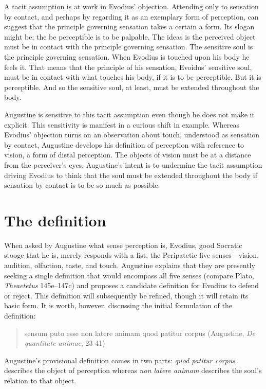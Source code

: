 \documentclass[12pt]{article}
\begin{document}
A tacit assumption is at work in Evodius' objection. Attending only to sensation by contact, and perhaps by regarding it as an exemplary form of perception, can suggest that the principle governing sensation takes a certain a form. Its slogan might be: the be perceptible is to be palpable. The ideas is the perceived object must be in contact with the principle governing sensation. The sensitive soul is the principle governing sensation. When Evodius is touched upon his body he feels it. That means that the principle of his sensation, Evoidus' sensitive soul, must be in contact with what touches his body, if it is to be perceptible. But it is perceptible. And so the sensitive soul, at least, must be extended throughout the body.

Augustine is sensitive to this tacit assumption even though he does not make it explicit. This sensitivity is manifest in a curious shift in example. Whereas Evodius' objection turns on an observation about touch, understood as sensation by contact, Augustine develops his definition of perception with reference to vision, a form of distal perception. The objects of vision must be at a distance from the perceiver's eyes. Augustine's intent is to undermine the tacit assumption driving Evodius to think that the soul must be extended throughout the body if sensation by contact is to be so much as possible.


\section{The definition} %
\label{sec:the_definition}

When asked by Augustine what sense perception is, Evodius, good Socratic stooge that he is, merely responds with a list, the Peripatetic five senses---vision, audition, olfaction, taste, and touch. Augustine explains that they are presently seeking a single definition that would encompass all five senses (compare Plato, \emph{Theaetetus} 145e--147c) and proposes a candidate definition for Evodius to defend or reject. This definition will subsequently be refined, though it will retain its basic form. It is worth, however, discussing the initial formulation of the definition: 
\begin{quote}
	sensum puto esse non latere animam quod patitur corpus (Augustine, \emph{De quantitate animae}, 23 41)
\end{quote}
Augustine's provisional definition comes in two parts: \emph{quod patitur corpus} describes the object of perception whereas \emph{non latere animam} describes the soul's relation to that object. 
\end{document}
